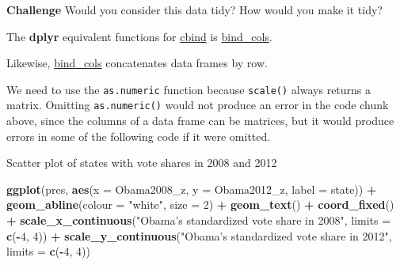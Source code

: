 \documentclass[]{book}
\newenvironment{Shaded}{\begin{snugshade}}{\end{snugshade}}
\newcommand{\KeywordTok}[1]{\textcolor[rgb]{0.13,0.29,0.53}{\textbf{#1}}}
\newcommand{\DataTypeTok}[1]{\textcolor[rgb]{0.13,0.29,0.53}{#1}}
\newcommand{\DecValTok}[1]{\textcolor[rgb]{0.00,0.00,0.81}{#1}}
\newcommand{\StringTok}[1]{\textcolor[rgb]{0.31,0.60,0.02}{#1}}
\newcommand{\OperatorTok}[1]{\textcolor[rgb]{0.81,0.36,0.00}{\textbf{#1}}}
\newcommand{\NormalTok}[1]{#1}
\theoremstyle{definition}
\theoremstyle{definition}
\theoremstyle{definition}
\theoremstyle{remark}
\begin{document}
\textbf{Challenge} Would you consider this data tidy? How would you make
it tidy?

The \textbf{dplyr} equivalent functions for
\href{https://www.rdocumentation.org/packages/base/topics/cbind}{cbind}
is
\href{https://www.rdocumentation.org/packages/dplyr/topics/bind_cols}{bind\_cols}.

\begin{Shaded}
\end{Shaded}

Likewise,
\href{https://www.rdocumentation.org/packages/dplyr/topics/bind_cols}{bind\_cols}
concatenates data frames by row.

We need to use the \texttt{as.numeric} function because \texttt{scale()}
always returns a matrix. Omitting \texttt{as.numeric()} would not
produce an error in the code chunk above, since the columns of a data
frame can be matrices, but it would produce errors in some of the
following code if it were omitted.

Scatter plot of states with vote shares in 2008 and 2012

\begin{Shaded}
\begin{Highlighting}[]
\KeywordTok{ggplot}\NormalTok{(pres, }\KeywordTok{aes}\NormalTok{(}\DataTypeTok{x =}\NormalTok{ Obama2008_z, }\DataTypeTok{y =}\NormalTok{ Obama2012_z, }\DataTypeTok{label =}\NormalTok{ state)) }\OperatorTok{+}
\StringTok{  }\KeywordTok{geom_abline}\NormalTok{(}\DataTypeTok{colour =} \StringTok{"white"}\NormalTok{, }\DataTypeTok{size =} \DecValTok{2}\NormalTok{) }\OperatorTok{+}
\StringTok{  }\KeywordTok{geom_text}\NormalTok{() }\OperatorTok{+}
\StringTok{  }\KeywordTok{coord_fixed}\NormalTok{() }\OperatorTok{+}
\StringTok{  }\KeywordTok{scale_x_continuous}\NormalTok{(}\StringTok{"Obama's standardized vote share in 2008"}\NormalTok{,}
                     \DataTypeTok{limits =} \KeywordTok{c}\NormalTok{(}\OperatorTok{-}\DecValTok{4}\NormalTok{, }\DecValTok{4}\NormalTok{)) }\OperatorTok{+}
\StringTok{  }\KeywordTok{scale_y_continuous}\NormalTok{(}\StringTok{"Obama's standardized vote share in 2012"}\NormalTok{,}
                     \DataTypeTok{limits =} \KeywordTok{c}\NormalTok{(}\OperatorTok{-}\DecValTok{4}\NormalTok{, }\DecValTok{4}\NormalTok{))}
\end{Highlighting}
\end{Shaded}
\end{document}
